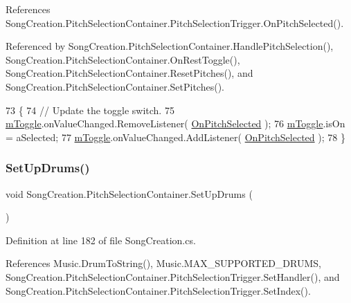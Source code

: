 References Song\+Creation.\+Pitch\+Selection\+Container.\+Pitch\+Selection\+Trigger.\+On\+Pitch\+Selected().



Referenced by Song\+Creation.\+Pitch\+Selection\+Container.\+Handle\+Pitch\+Selection(), Song\+Creation.\+Pitch\+Selection\+Container.\+On\+Rest\+Toggle(), Song\+Creation.\+Pitch\+Selection\+Container.\+Reset\+Pitches(), and Song\+Creation.\+Pitch\+Selection\+Container.\+Set\+Pitches().


\begin{DoxyCode}
73             \{
74                 \textcolor{comment}{// Update the toggle switch.}
75                 \hyperlink{group___s_c_handlers_gaa289269d96356379b79d3918535561fd}{mToggle}.onValueChanged.RemoveListener( \hyperlink{group___s_c_handlers_gac113e02950a228fc6c78ad5972238a98}{OnPitchSelected} );
76                 \hyperlink{group___s_c_handlers_gaa289269d96356379b79d3918535561fd}{mToggle}.isOn = aSelected;
77                 \hyperlink{group___s_c_handlers_gaa289269d96356379b79d3918535561fd}{mToggle}.onValueChanged.AddListener( \hyperlink{group___s_c_handlers_gac113e02950a228fc6c78ad5972238a98}{OnPitchSelected} );
78             \}
\end{DoxyCode}
\mbox{\label{group___s_c_handlers_gae0bda65460aedf8384cd51bd6079d85b}} 
\subsubsection{\texorpdfstring{Set\+Up\+Drums()}{SetUpDrums()}}
{\footnotesize\ttfamily void Song\+Creation.\+Pitch\+Selection\+Container.\+Set\+Up\+Drums (\begin{DoxyParamCaption}{ }\end{DoxyParamCaption})}



Definition at line 182 of file Song\+Creation.\+cs.



References Music.\+Drum\+To\+String(), Music.\+M\+A\+X\+\_\+\+S\+U\+P\+P\+O\+R\+T\+E\+D\+\_\+\+D\+R\+U\+MS, Song\+Creation.\+Pitch\+Selection\+Container.\+Pitch\+Selection\+Trigger.\+Set\+Handler(), and Song\+Creation.\+Pitch\+Selection\+Container.\+Pitch\+Selection\+Trigger.\+Set\+Index().




